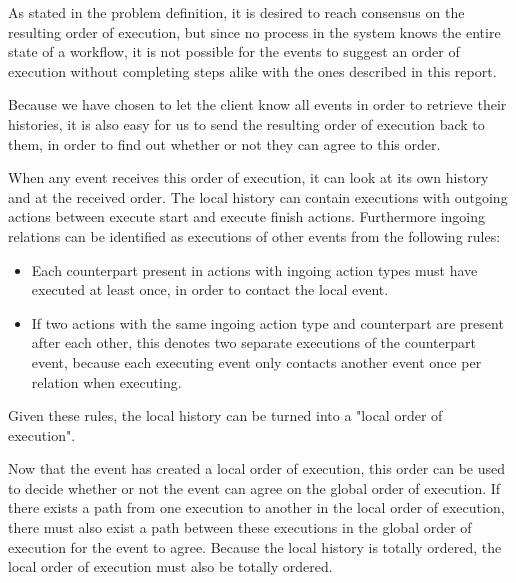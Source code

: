 	\newpar As stated in the problem definition, it is desired to reach consensus on the resulting order of execution, but since no process in the system knows the entire state of a workflow, it is not possible for the events to suggest an order of execution without completing steps alike with the ones described in this report.
	
	\newpar Because we have chosen to let the client know all events in order to retrieve their histories, it is also easy for us to send the resulting order of execution back to them, in order to find out whether or not they can agree to this order.
	
	\newpar When any event receives this order of execution, it can look at its own history and at the received order. The local history can contain executions with outgoing actions between execute start and execute finish actions. Furthermore ingoing relations can be identified as executions of other events from the following rules:
	
	\begin{itemize}
		\item Each counterpart present in actions with ingoing action types must have executed at least once, in order to contact the local event.
		\item If two actions with the same ingoing action type and counterpart are present after each other, this denotes two separate executions of the counterpart event, because each executing event only contacts another event once per relation when executing.
	\end{itemize}
	
	
	\newpar	Given these rules, the local history can be turned into a "local order of execution".
	
	\newpar Now that the event has created a local order of execution, this order can be used to decide whether or not the event can agree on the global order of execution. If there exists a path from one execution to another in the local order of execution, there must also exist a path between these executions in the global order of execution for the event to agree. Because the local history is totally ordered, the local order of execution must also be totally ordered.
	
